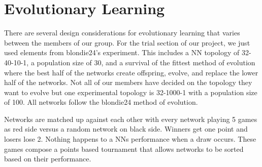 \documentclass{article}
\begin{document}
\section{Evolutionary Learning}

There are several design considerations for evolutionary
learning that varies between the members of our group. For the trial section of
our project, we just used elements from blondie24’s experiment. This includes a
NN topology of 32-40-10-1, a population size of 30, and a survival of the
fittest method of evolution where the best half of the networks create
offspring, evolve, and replace the lower half of the networks. Not all of our
members have decided on the topology they want to evolve but one experimental
topology is 32-1000-1 with a population size of 100. All networks follow the
blondie24 method of evolution.

Networks are matched up against each other with
every network playing 5 games as red side versus a random network on black
side. Winners get one point and losers lose 2. Nothing happens to a NNs
performance when a draw occurs. These games compose a points based tournament
that allows networks to be sorted based on their performance.
\end{document}
